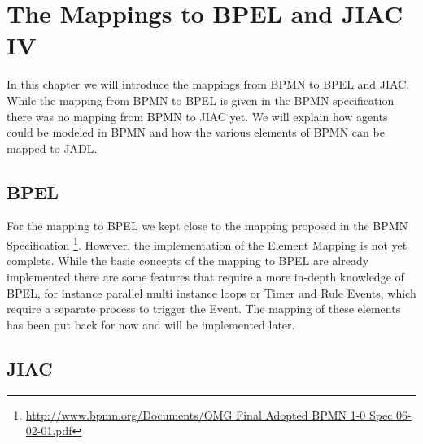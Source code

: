 \chapter{The Mappings to BPEL and JIAC IV}
\label{chapter:jiacMapping}

In this chapter we will introduce the mappings from BPMN to BPEL and JIAC. While the mapping from BPMN to BPEL is given in the BPMN specification there was no mapping from BPMN to JIAC yet. We will explain how agents could be modeled in BPMN and how the various elements of BPMN can be mapped to JADL.

\section{BPEL}
For the mapping to BPEL we kept close to the mapping proposed in the BPMN Specification \footnote{\url{http://www.bpmn.org/Documents/OMG Final Adopted BPMN 1-0 Spec 06-02-01.pdf}}. However, the implementation of the Element Mapping is not yet complete. While the basic concepts of the mapping to BPEL are already implemented there are some features that require a more in-depth knowledge of BPEL, for instance parallel multi instance loops or Timer and Rule Events, which require a separate process to trigger the Event. The mapping of these elements has been put back for now and will be implemented later.

\section{JIAC}
\label{sec:jiacMapping}




